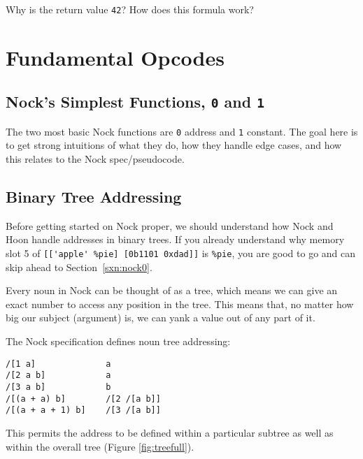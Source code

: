 \documentclass[twoside]{article}
\begin{document}
Why is the return value \lstinline[style=inlinecode]{42}? How does this formula work?

\section{Fundamental Opcodes}

\subsection{Nock's Simplest Functions, \lstinline[style=inlinecode]{0} and \lstinline[style=inlinecode]{1}}

The two most basic Nock functions are \lstinline[style=inlinecode]{0} address and \lstinline[style=inlinecode]{1} constant. The goal here is to get strong intuitions of what they do, how they handle edge cases, and how this relates to the Nock spec/pseudocode.

\subsection{Binary Tree Addressing}

Before getting started on Nock proper, we should understand how Nock and Hoon handle addresses in binary trees.  If you already understand why memory slot 5 of \lstinline[style=inlinecode]{[['apple' %pie] [0b1101 0xdad]]} is \lstinline[style=inlinecode]{%pie}, you are good to go and can skip ahead to Section~\ref{sxn:nock0}.

Every noun in Nock can be thought of as a tree, which means we can give an exact number to access any position in the tree. This means that, no matter how big our subject (argument) is, we can yank a value out of any part of it.

The Nock specification defines noun tree addressing:

\begin{lstlisting}[style=listingcode]
/[1 a]              a
/[2 a b]            a
/[3 a b]            b
/[(a + a) b]        /[2 /[a b]]
/[(a + a + 1) b]    /[3 /[a b]]
\end{lstlisting}

\noindent
This permits the address to be defined within a particular subtree as well as within the overall tree (Figure \ref{fig:treefull}).
\end{document}
